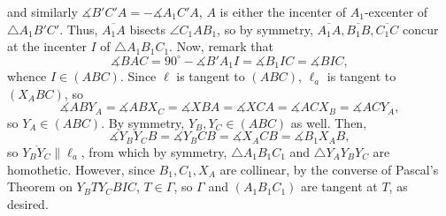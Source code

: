 and similarly $\measuredangle B'C'A=-\measuredangle A_1C'A$, $A$ is either the incenter of $A_1$-excenter of $\triangle A_1B'C'$. Thus, $\overline{A_1A}$ bisects $\angle C_1AB_1$, so by symmetry, $\overline{A_1A},\overline{B_1B},\overline{C_1C}$ concur at the incenter $I$ of $\triangle A_1B_1C_1$. Now, remark that \[\measuredangle BAC=90^\circ-\measuredangle B'A_1I=\measuredangle B_1IC=\measuredangle BIC,\]
whence $I\in(ABC)$. Since $\ell$ is tangent to $(ABC)$, $\ell_a$ is tangent to $(X_ABC)$, so \[\measuredangle ABY_A=\measuredangle ABX_C=\measuredangle XBA=\measuredangle XCA=\measuredangle ACX_B=\measuredangle ACY_A,\]
so $Y_A\in(ABC)$. By symmetry, $Y_B,Y_C\in(ABC)$ as well. Then, \[\measuredangle Y_BY_CB=\measuredangle Y_BCB=\measuredangle X_ACB=\measuredangle B_1X_AB,\]
so $\overline{Y_BY_C}\parallel\ell_a$, from which by symmetry, $\triangle A_1B_1C_1$ and $\triangle Y_AY_BY_C$ are homothetic. However, since $B_1,C_1,X_A$ are collinear, by the converse of Pascal's Theorem on $Y_BTY_CBIC$, $T\in\Gamma$, so $\Gamma$ and $(A_1B_1C_1)$ are tangent at $T$, as desired.
